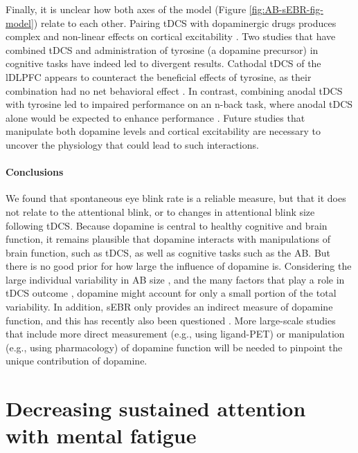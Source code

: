 \documentclass[11pt,]{memoir}
\begin{document}
Finally, it is unclear how both axes of the model (Figure \ref{fig:AB-sEBR-fig-model}) relate to each other. Pairing tDCS with dopaminergic drugs produces complex and non-linear effects on cortical excitability \autocites{Monte-Silva2009}{Fresnoza2014}. Two studies that have combined tDCS and administration of tyrosine (a dopamine precursor) in cognitive tasks have indeed led to divergent results. Cathodal tDCS of the lDLPFC appears to counteract the beneficial effects of tyrosine, as their combination had no net behavioral effect \autocites{Jongkees2017}{Dennison2018}. In contrast, combining anodal tDCS with tyrosine led to impaired performance on an n-back task, where anodal tDCS alone would be expected to enhance performance \autocite{Jongkees2017}. Future studies that manipulate both dopamine levels and cortical excitability are necessary to uncover the physiology that could lead to such interactions.

\hypertarget{conclusions}{%
\subsection{Conclusions}\label{conclusions}}

We found that spontaneous eye blink rate is a reliable measure, but that it does not relate to the attentional blink, or to changes in attentional blink size following tDCS. Because dopamine is central to healthy cognitive and brain function, it remains plausible that dopamine interacts with manipulations of brain function, such as tDCS, as well as cognitive tasks such as the AB. But there is no good prior for how large the influence of dopamine is. Considering the large individual variability in AB size \autocite{Willems2016}, and the many factors that play a role in tDCS outcome \autocites{Li2015b}{Krause2014}, dopamine might account for only a small portion of the total variability. In addition, sEBR only provides an indirect measure of dopamine function, and this has recently also been questioned \autocites{Dang2017}{Sescousse2018}. More large-scale studies that include more direct measurement (e.g., using ligand-PET) or manipulation (e.g., using pharmacology) of dopamine function will be needed to pinpoint the unique contribution of dopamine.

\hypertarget{part-MF}{%
\part{Decreasing sustained attention with mental fatigue}\label{part-MF}}
\end{document}
